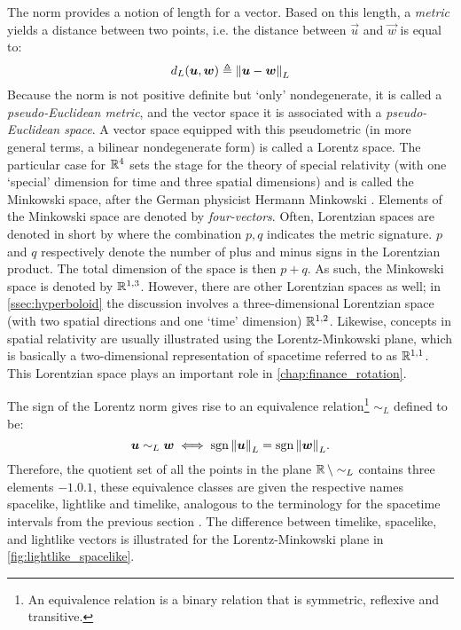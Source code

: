 The norm provides a notion of length for a vector. Based on this length, a \emph{metric} yields a distance between two points, i.e. the distance between \(\vec{u}\) and \(\vec{w}\) is equal to:
\[
     d_L(\vb*{u}, \vb*{w}) \triangleq \norm{\vb*{u} - \vb*{w}}_L
\] 
Because the norm is not positive definite but `only' nondegenerate, it is called a \emph{pseudo-Euclidean metric}, and the vector space it is associated with a \emph{pseudo-Euclidean space}. A vector space equipped with this pseudometric (in more general terms, a bilinear nondegenerate form) is called a Lorentz space. The particular case for \(\mathbb{R}^4\) sets the stage for the theory of special relativity (with one `special' dimension for time and three spatial dimensions) and is called the Minkowski space, after the German physicist Hermann Minkowski \cite{Catoni2008}. Elements of the Minkowski space are denoted by \emph{four-vectors}. Often, Lorentzian spaces are denoted in short by  where the combination $p,q$ indicates the metric signature. $p$ and $q$ respectively denote the number of plus and minus signs in the Lorentzian product. The total dimension of the space is then $p + q$. As such, the Minkowski space is denoted by $\mathbb{R}^{1,3}$. However, there are other Lorentzian spaces as well; in \cref{ssec:hyperboloid} the discussion involves a three-dimensional Lorentzian space (with two spatial directions and one `time' dimension) $\mathbb{R}^{1,2}$. Likewise, concepts in spatial relativity are usually illustrated using the Lorentz-Minkowski plane, which is basically a two-dimensional representation of spacetime referred to as $\mathbb{R}^{1,1}$. This Lorentzian space plays an important role in \cref{chap:finance_rotation}.

The sign of the Lorentz norm gives rise to an equivalence relation\footnote{An equivalence relation  is a binary relation that is symmetric, reflexive and transitive.}  \(\sim_L\) defined to be:
$$\vb*{u} \sim_L \vb*{w} \iff \operatorname{sgn}{\norm{\vb*{u}}}_L = \operatorname{sgn}{\norm{\vb*{w}}}_L.$$
Therefore, the quotient set of all the points in the plane \(\mathbb{R}\,\backslash\sim_L\) contains three elements \(\qty{-1, 0, 1}\), these equivalence classes are given the respective names spacelike, lightlike and timelike, analogous to the terminology for the spacetime intervals from the previous section \cite{Landau1971}. The difference between timelike, spacelike, and lightlike vectors is illustrated for the Lorentz-Minkowski plane in \cref{fig:lightlike_spacelike}.

